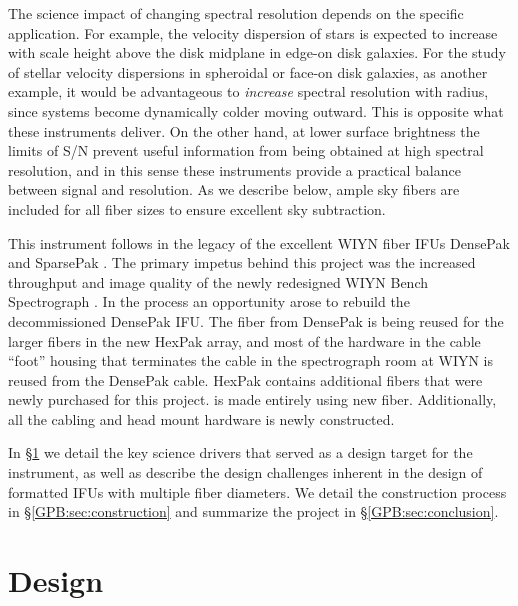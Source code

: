 The science impact of changing spectral resolution depends on the specific
application.  For example, the velocity dispersion of stars is expected to
increase with scale height above the disk midplane in edge-on disk galaxies.
For the study of stellar velocity dispersions in spheroidal or face-on disk
galaxies, as another example, it would be advantageous to \emph{increase}
spectral resolution with radius, since systems become dynamically colder
moving outward.  This is opposite what these instruments deliver.  On the
other hand, at lower surface brightness the limits of S/N prevent useful
information from being obtained at high spectral resolution, and in this sense
these instruments provide a practical balance between signal and resolution.
As we describe below, ample sky fibers are included for all fiber sizes to
ensure excellent sky subtraction.

This instrument follows in the legacy of the excellent WIYN fiber IFUs
DensePak \citep{Barden98} and SparsePak \citep{Bershady04,Bershady05}.  The
primary impetus behind this project was the increased throughput and image
quality of the newly redesigned WIYN Bench Spectrograph
\citep{Barden94,Bershady08,Knezek10}.  In the process an opportunity arose to
rebuild the decommissioned DensePak IFU.  The fiber from DensePak is being
reused for the larger fibers in the new HexPak array, and most of the hardware
in the cable ``foot'' housing that terminates the cable in the spectrograph
room at WIYN is reused from the DensePak cable.  HexPak contains additional
fibers that were newly purchased for this project.  \GP is made entirely using
new fiber.  Additionally, all the cabling and head mount hardware is newly
constructed.


In \S\ref{GPB:sec:design} we detail the key science drivers that served as a
design target for the instrument, as well as describe the design challenges
inherent in the design of formatted IFUs with multiple fiber diameters.  We
detail the construction process in \S\ref{GPB:sec:construction} and summarize the
project in \S\ref{GPB:sec:conclusion}.

\section{Design} 
\label{GPB:sec:design}

